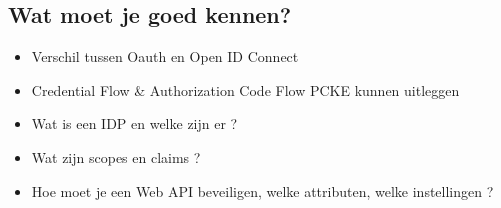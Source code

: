 \documentclass{article}
\begin{document}
\subsection{Wat moet je goed kennen?}

\begin{itemize}
    \item Verschil tussen Oauth en Open ID Connect
    \item Credential Flow \& Authorization Code Flow PCKE kunnen uitleggen
    \item Wat is een IDP en welke zijn er ?
    \item Wat zijn scopes en claims ?
    \item Hoe moet je een Web API beveiligen, welke attributen, welke instellingen ?
\end{itemize}
\end{document}
